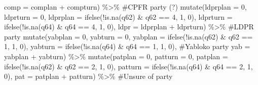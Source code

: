 \documentclass[
  letterpaper,
  DIV=11,
  numbers=noendperiod]{scrartcl}
\newenvironment{Shaded}{\begin{snugshade}}{\end{snugshade}}
\newcommand{\AttributeTok}[1]{\textcolor[rgb]{0.40,0.45,0.13}{#1}}
\newcommand{\CommentTok}[1]{\textcolor[rgb]{0.37,0.37,0.37}{#1}}
\newcommand{\DecValTok}[1]{\textcolor[rgb]{0.68,0.00,0.00}{#1}}
\newcommand{\FunctionTok}[1]{\textcolor[rgb]{0.28,0.35,0.67}{#1}}
\newcommand{\NormalTok}[1]{\textcolor[rgb]{0.00,0.23,0.31}{#1}}
\newcommand{\SpecialCharTok}[1]{\textcolor[rgb]{0.37,0.37,0.37}{#1}}
\begin{document}
\begin{Shaded}
\begin{Highlighting}[]
         \AttributeTok{comp =}\NormalTok{ complan }\SpecialCharTok{+}\NormalTok{ compturn) }\SpecialCharTok{\%\textgreater{}\%} \CommentTok{\#CPFR party (?)}
  \FunctionTok{mutate}\NormalTok{(}\AttributeTok{ldprplan =} \DecValTok{0}\NormalTok{, }\AttributeTok{ldprturn =} \DecValTok{0}\NormalTok{,}
         \AttributeTok{ldprplan =} \FunctionTok{ifelse}\NormalTok{(}\SpecialCharTok{!}\FunctionTok{is.na}\NormalTok{(q62) }\SpecialCharTok{\&}\NormalTok{ q62 }\SpecialCharTok{==} \DecValTok{4}\NormalTok{, }\DecValTok{1}\NormalTok{, }\DecValTok{0}\NormalTok{),}
         \AttributeTok{ldprturn =} \FunctionTok{ifelse}\NormalTok{(}\SpecialCharTok{!}\FunctionTok{is.na}\NormalTok{(q64) }\SpecialCharTok{\&}\NormalTok{ q64 }\SpecialCharTok{==} \DecValTok{4}\NormalTok{, }\DecValTok{1}\NormalTok{, }\DecValTok{0}\NormalTok{),}
         \AttributeTok{ldpr =}\NormalTok{ ldprplan }\SpecialCharTok{+}\NormalTok{ ldprturn) }\SpecialCharTok{\%\textgreater{}\%} \CommentTok{\#LDPR party}
  \FunctionTok{mutate}\NormalTok{(}\AttributeTok{yabplan =} \DecValTok{0}\NormalTok{, }\AttributeTok{yabturn =} \DecValTok{0}\NormalTok{,}
         \AttributeTok{yabplan =} \FunctionTok{ifelse}\NormalTok{(}\SpecialCharTok{!}\FunctionTok{is.na}\NormalTok{(q62) }\SpecialCharTok{\&}\NormalTok{ q62 }\SpecialCharTok{==} \DecValTok{1}\NormalTok{, }\DecValTok{1}\NormalTok{, }\DecValTok{0}\NormalTok{),}
         \AttributeTok{yabturn =} \FunctionTok{ifelse}\NormalTok{(}\SpecialCharTok{!}\FunctionTok{is.na}\NormalTok{(q64) }\SpecialCharTok{\&}\NormalTok{ q64 }\SpecialCharTok{==} \DecValTok{1}\NormalTok{, }\DecValTok{1}\NormalTok{, }\DecValTok{0}\NormalTok{), }\CommentTok{\#Yabloko party}
         \AttributeTok{yab =}\NormalTok{ yabplan }\SpecialCharTok{+}\NormalTok{ yabturn) }\SpecialCharTok{\%\textgreater{}\%} 
  \FunctionTok{mutate}\NormalTok{(}\AttributeTok{patplan =} \DecValTok{0}\NormalTok{, }\AttributeTok{patturn =} \DecValTok{0}\NormalTok{,}
         \AttributeTok{patplan =} \FunctionTok{ifelse}\NormalTok{(}\SpecialCharTok{!}\FunctionTok{is.na}\NormalTok{(q62) }\SpecialCharTok{\&}\NormalTok{ q62 }\SpecialCharTok{==} \DecValTok{2}\NormalTok{, }\DecValTok{1}\NormalTok{, }\DecValTok{0}\NormalTok{),}
         \AttributeTok{patturn =} \FunctionTok{ifelse}\NormalTok{(}\SpecialCharTok{!}\FunctionTok{is.na}\NormalTok{(q64) }\SpecialCharTok{\&}\NormalTok{ q64 }\SpecialCharTok{==} \DecValTok{2}\NormalTok{, }\DecValTok{1}\NormalTok{, }\DecValTok{0}\NormalTok{),}
         \AttributeTok{pat =}\NormalTok{ patplan }\SpecialCharTok{+}\NormalTok{ patturn) }\SpecialCharTok{\%\textgreater{}\%} \CommentTok{\#Unsure of party}

\end{Highlighting}
\end{Shaded}
\end{document}
